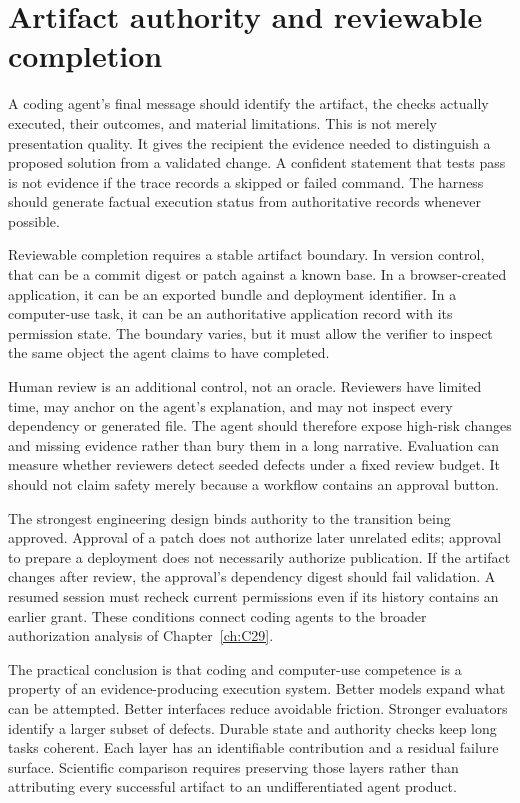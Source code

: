 \section{Artifact authority and reviewable completion}\label{sec:C23:completion}
A coding agent's final message should identify the artifact, the checks actually executed, their outcomes, and material limitations. This is not merely presentation quality. It gives the recipient the evidence needed to distinguish a proposed solution from a validated change. A confident statement that tests pass is not evidence if the trace records a skipped or failed command. The harness should generate factual execution status from authoritative records whenever possible.

Reviewable completion requires a stable artifact boundary. In version control, that can be a commit digest or patch against a known base. In a browser-created application, it can be an exported bundle and deployment identifier. In a computer-use task, it can be an authoritative application record with its permission state. The boundary varies, but it must allow the verifier to inspect the same object the agent claims to have completed.

Human review is an additional control, not an oracle. Reviewers have limited time, may anchor on the agent's explanation, and may not inspect every dependency or generated file. The agent should therefore expose high-risk changes and missing evidence rather than bury them in a long narrative. Evaluation can measure whether reviewers detect seeded defects under a fixed review budget. It should not claim safety merely because a workflow contains an approval button.

The strongest engineering design binds authority to the transition being approved. Approval of a patch does not authorize later unrelated edits; approval to prepare a deployment does not necessarily authorize publication. If the artifact changes after review, the approval's dependency digest should fail validation. A resumed session must recheck current permissions even if its history contains an earlier grant. These conditions connect coding agents to the broader authorization analysis of Chapter~\ref{ch:C29}.

The practical conclusion is that coding and computer-use competence is a property of an evidence-producing execution system. Better models expand what can be attempted. Better interfaces reduce avoidable friction. Stronger evaluators identify a larger subset of defects. Durable state and authority checks keep long tasks coherent. Each layer has an identifiable contribution and a residual failure surface. Scientific comparison requires preserving those layers rather than attributing every successful artifact to an undifferentiated agent product.
